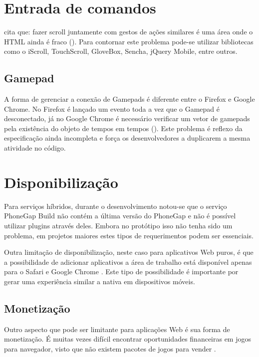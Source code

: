\section{Entrada de comandos}

\citet[p. 9]{aSeriousContender} cita que: fazer scroll juntamente
com gestos de ações similares é uma área onde o HTML ainda é
fraco (). Para contornar este problema pode-se utilizar bibliotecas como o
iScroll, TouchScroll, GloveBox, Sencha, jQuery Mobile, entre outros.

\subsection{Gamepad}

A forma de gerenciar a conexão de Gamepads é diferente entre o Firefox
e Google Chrome. No Firefox é lançado um evento toda a vez que o
Gamepad é desconectado, já no Google Chrome é necessário verificar
um vetor de gamepads pela existência do objeto de tempos em tempos
\autocite{gamepad} (). Este problema é
reflexo da especificação ainda incompleta e força os desenvolvedores
a duplicarem a mesma atividade no código.

\section{Disponibilização}

Para serviços híbridos, durante o desenvolvimento notou-se que o
serviço PhoneGap Build não contém a última versão do PhoneGap e
não é possível utilizar plugins através deles. Embora no protótipo
isso não tenha sido um problema, em projetos maiores estes tipos de
requerimentos podem ser essenciais.

Outra limitação de disponibilização, neste caso para aplicativos
Web puros, é que a possibilidade de adicionar aplicativos a área
de trabalho está disponível apenas para o Safari e Google Chrome
. Este tipo de possibilidade é importante por
gerar uma experiência similar a nativa em dispositivos móveis.

\subsection{Monetização}

Outro aspecto que pode ser limitante para aplicações Web é sua forma
de monetização. É muitas vezes difícil encontrar oportunidades
financeiras em jogos para navegador, visto que não existem pacotes de
jogos para vender \autocite[p. 44]{gameCommunities} .


